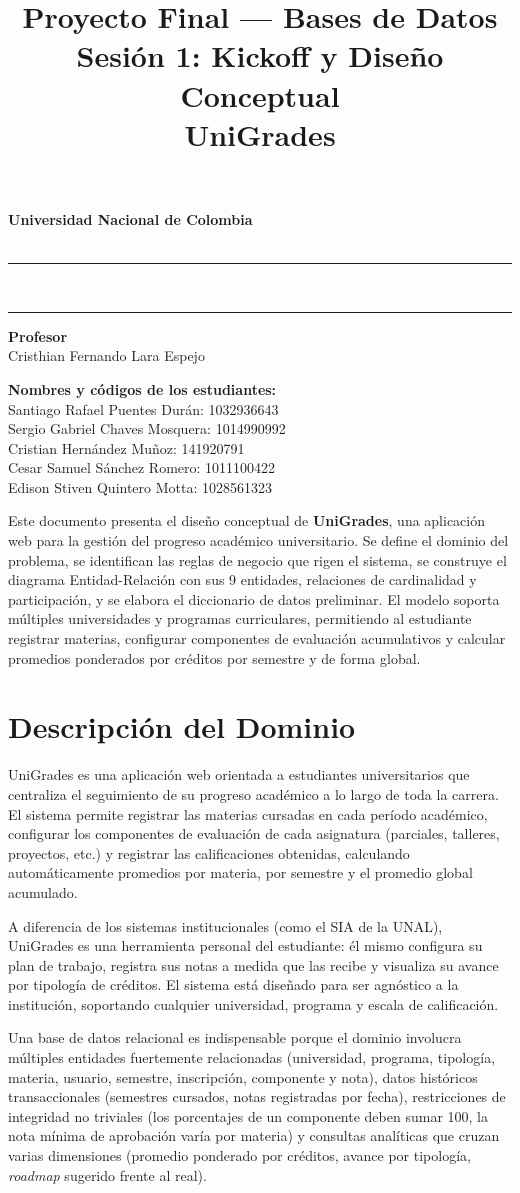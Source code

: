 \documentclass[12pt, letterpaper, twoside]{article}
\title{\textbf{Proyecto Final --- Bases de Datos\\[0.3em]
Sesión 1: Kickoff y Diseño Conceptual\\[0.3em]
\guillemotleft UniGrades\guillemotright}}
\affiliation{Sede Bogotá}
\renewenvironment{abstract}{%
  \small\begin{center}%
  {\bfseries\abstractname\vspace{-.5em}}%
  \end{center}%
  \quotation}{%
  \endquotation}
\renewcommand{\maketitle}{%
\begin{titlepage}
  \centering
  \vspace*{1.5cm}
  {\large\bfseries\color{azulUNAL}
    Universidad Nacional de Colombia\\[0.3em]
    \normalsize\color{black}\theaffiliation\\[0.1em]
    \thedepartment\par}
  \vspace{1cm}
  \rule{\linewidth}{1.5pt}\\[0.4em]
  {\LARGE\bfseries\thetitle\par}
  \rule{\linewidth}{1.5pt}
  \vspace{1cm}

  {\normalsize\textbf{Profesor}\\[0.2em]
  Cristhian Fernando Lara Espejo\par}

  \vspace{1.2cm}

  {\normalsize\textbf{Nombres y códigos de los estudiantes:}\\[0.4em]
  Santiago Rafael Puentes Durán: 1032936643\\[0.2em]
  Sergio Gabriel Chaves Mosquera: 1014990992\\[0.2em]
  Cristian Hernández Muñoz: 141920791\\[0.2em]
  Cesar Samuel Sánchez Romero: 1011100422\\[0.2em]
  Edison Stiven Quintero Motta: 1028561323\par}

  \vfill
  {\small\color{gray}\thetheyear}
\end{titlepage}
}
\begin{document}
\maketitle
\thispagestyle{firstpage}
\newpage

\begin{abstract}
\noindent
Este documento presenta el diseño conceptual de \textbf{UniGrades}, una aplicación
web para la gestión del progreso académico universitario. Se define el dominio del
problema, se identifican las reglas de negocio que rigen el sistema, se construye
el diagrama Entidad-Relación con sus 9 entidades, relaciones de cardinalidad y
participación, y se elabora el diccionario de datos preliminar. El modelo soporta
múltiples universidades y programas curriculares, permitiendo al estudiante registrar
materias, configurar componentes de evaluación acumulativos y calcular promedios
ponderados por créditos por semestre y de forma global.
\end{abstract}

\vspace{1.5cm}
\tableofcontents
\newpage

\section{Descripción del Dominio}
\label{sec:dominio}

UniGrades es una aplicación web orientada a estudiantes universitarios que centraliza
el seguimiento de su progreso académico a lo largo de toda la carrera. El sistema
permite registrar las materias cursadas en cada período académico, configurar los
componentes de evaluación de cada asignatura (parciales, talleres, proyectos, etc.)
y registrar las calificaciones obtenidas, calculando automáticamente promedios por
materia, por semestre y el promedio global acumulado.

A diferencia de los sistemas institucionales (como el SIA de la UNAL), UniGrades
es una herramienta personal del estudiante: él mismo configura su plan de trabajo,
registra sus notas a medida que las recibe y visualiza su avance por tipología de
créditos. El sistema está diseñado para ser agnóstico a la institución, soportando
cualquier universidad, programa y escala de calificación.

Una base de datos relacional es indispensable porque el dominio involucra múltiples
entidades fuertemente relacionadas (universidad, programa, tipología, materia,
usuario, semestre, inscripción, componente y nota), datos históricos transaccionales
(semestres cursados, notas registradas por fecha), restricciones de integridad no
triviales (los porcentajes de un componente deben sumar 100, la nota mínima de
aprobación varía por materia) y consultas analíticas que cruzan varias dimensiones
(promedio ponderado por créditos, avance por tipología, \textit{roadmap} sugerido
frente al real).
\end{document}
